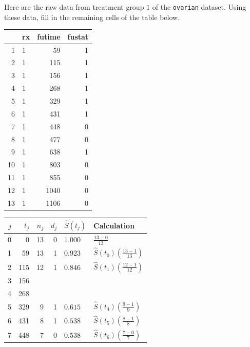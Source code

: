 \begin{question}{}
Here are the raw data from treatment group $1$ of the \texttt{ovarian} dataset. Using these data, fill in the remaining cells of the table below.
{\small
\begin{center}
\begin{tabular}{rlrr}
  \toprule
 & rx & futime & fustat \\ 
  \midrule
  1 & 1 & 59 & 1 \\ 
  2 & 1 & 115 & 1 \\ 
  3 & 1 & 156 & 1 \\ 
  4 & 1 & 268 & 1 \\ 
  5 & 1 & 329 & 1 \\ 
  6 & 1 & 431 & 1 \\ 
  7 & 1 & 448 & 0 \\ 
  8 & 1 & 477 & 0 \\ 
  9 & 1 & 638 & 1 \\ 
  10 & 1 & 803 & 0 \\ 
  11 & 1 & 855 & 0 \\ 
  12 & 1 & 1040 & 0 \\ 
  13 & 1 & 1106 & 0 \\ 
  \bottomrule
\end{tabular}
\end{center}
}
\vspace{-5mm}
{\small
\begin{center}
\begin{tabular}{rrrrll}
  \toprule
$j$ & $t_j$ & $n_j$ & $d_j$ & $\hat{S}(t_j)$ & Calculation \\ 
  \midrule
  0 & 0 & 13 & 0 & $1.000$ & $\frac{13-0}{13}$ \\
  1 & 59 & 13 & 1 & $0.923$ & $\hat{S}(t_0) \left(\frac{13-1}{13}\right)$ \\
  2 & 115 & 12 & 1 & $0.846$ & $\hat{S}(t_1) \left(\frac{12-1}{12}\right)$ \\[2mm]
  3 & 156 & \\[2mm] %
  4 & 268 & \\[2mm] %
  5 & 329 & 9 & 1 & $0.615$ & $\hat{S}(t_4) \left(\frac{9-1}{9}\right)$ \\
  6 & 431 & 8 & 1 & $0.538$ & $\hat{S}(t_5) \left(\frac{8-1}{8}\right)$ \\
  7 & 448 & 7 & 0 & $0.538$ & $\hat{S}(t_6) \left(\frac{7-0}{7}\right)$ \\

\end{tabular}
\end{center}}
\end{question}
